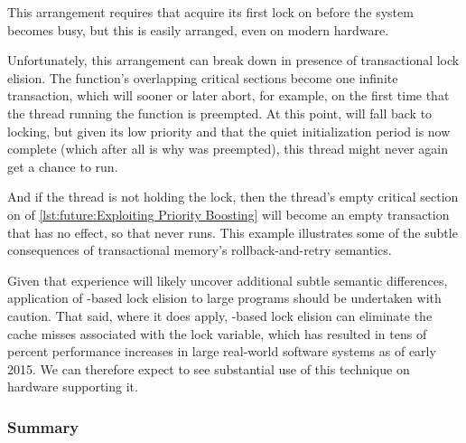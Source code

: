 \begin{fcvref}
This arrangement requires that  acquire its first
lock on  before the system becomes busy, but this is easily
arranged, even on modern hardware.

Unfortunately, this arrangement can break down in presence of transactional
lock elision.
The  function's overlapping critical sections become
one infinite transaction, which will sooner or later abort,
for example, on the first time that the thread running
the  function is preempted.
At this point,  will fall back to locking, but given
its low priority and that the quiet initialization period is now
complete (which after all is why  was preempted),
this thread might never again get a chance to run.

And if the  thread is not holding the lock, then
the  thread's empty critical section on  of
\cref{lst:future:Exploiting Priority Boosting}
will become an empty transaction that has no effect, so that
 never runs.
This example illustrates some of the subtle consequences of
transactional memory's rollback-and-retry semantics.
\end{fcvref}

Given that experience will likely uncover additional subtle semantic
differences, application of -based lock elision to large programs
should be undertaken with caution.
That said, where it does apply, -based lock elision can eliminate
the cache misses associated with the lock variable, which has resulted
in tens of percent performance increases in large real-world software
systems as of early 2015.
We can therefore expect to see substantial use of this technique on
hardware supporting it.

\QuickQuizEnd

\subsubsection{Summary}
\label{sec:future:HTM Weaknesses WRT Locking: Summary}



